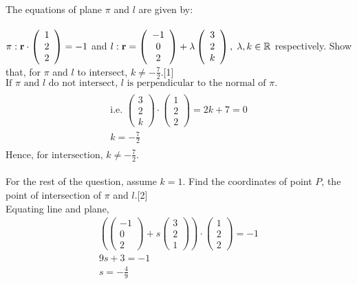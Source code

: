 \documentclass[12pt, a4 paper]{article}
\begin{document}
\begin{outline}[enumerate]
					\1 The equations of plane $\pi $ and $l$ are given by:\\\\
					$\pi :{\bf{r}} \cdot \left( {\begin{array}{*{20}{c}}1\\2\\2\end{array}} \right) =  - 1$ and $l:{\bf{r}} = \left( {\begin{array}{*{20}{c}}{ - 1}\\0\\2\end{array}} \right) + \lambda \left( {\begin{array}{*{20}{c}}3\\2\\k\end{array}} \right),\;\lambda ,k \in \mathbb{R}$ respectively.
					\2 Show that, for $\pi $ and $l$ to intersect, $k \ne  - \frac{7}{2}$.\hfill[1]
					\color{blue}\\
					${\textrm{If }}\pi {\textrm{ and }}l{\textrm{ do not intersect, }}l{\textrm{ is perpendicular to the normal of }}\pi {\textrm{.}}$
					\begin{align*}	\\{\textrm{i}}{\textrm{.e}}{\textrm{. }}\left( {\begin{array}{*{20}{c}}3\\2\\k\end{array}} \right) \cdot \left( {\begin{array}{*{20}{c}}1\\2\\2\end{array}} \right) = 2k + 7 = 0\\k =  - \frac{7}{2}\\
					\end{align*}
					${\textrm{Hence, for intersection, }}k \ne  - \frac{7}{2}.$\\\\
					\color{black}
					For the rest of the question, assume $k = 1$.
					\2 Find the coordinates of point $P$, the point of intersection of $\pi $ and $l$.\hfill[2]
					\color{blue}
					\\{\textrm{Equating line and plane,}}
					\begin{align*}
						\left( {\left( {\begin{array}{*{20}{c}}{ - 1} \\0\\2\end{array}} \right) + s\left( {\begin{array}{*{20}{c}}3\\2\\1\end{array}} \right)} \right) \cdot \left( {\begin{array}{*{20}{c}}1\\2\\2\end{array}} \right) =  - 1\\9s + 3 =  - 1\\s =  - \frac{4}{9}\\

\end{align*}
\end{outline}
\end{document}

